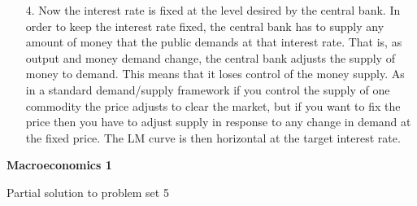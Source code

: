 \documentclass[12pt,a4paper]{article}
\begin{document}
\begin{enumerate}
\item [4.] Now the interest rate is fixed at the level desired by the central
  bank.  In order to keep the interest rate fixed, the central bank has
  to supply any amount of money that the public demands at that interest
  rate. That is, as output and money demand change, the central bank
  adjusts the supply of money to demand. This means that it loses
  control of the money supply. As in a standard demand/supply framework
  if you control the supply of one commodity the price adjusts to clear
  the market, but if you want to fix the price then you have to adjust
  supply in response to any change in demand at the fixed price. The LM
  curve is then horizontal at the target interest rate.

\end{enumerate}
  \newpage
\begin{center}
  \textbf{Macroeconomics 1}

Partial  solution to problem set 5
\end{center}


\end{document}
